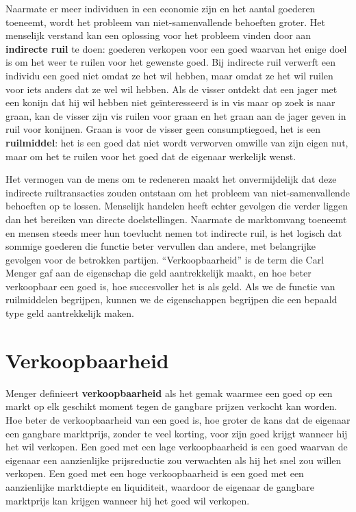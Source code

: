 Naarmate er meer individuen in een economie zijn en het aantal goederen toeneemt, wordt het probleem van niet-samenvallende behoeften groter. Het menselijk verstand kan een oplossing voor het probleem vinden door aan \textbf{indirecte ruil} te doen: goederen verkopen voor een goed waarvan het enige doel is om het weer te ruilen voor het gewenste goed. Bij indirecte ruil verwerft een individu een goed niet omdat ze het wil hebben, maar omdat ze het wil ruilen voor iets anders dat ze wel wil hebben. Als de visser ontdekt dat een jager met een konijn dat hij wil hebben niet geïnteresseerd is in vis maar op zoek is naar graan, kan de visser zijn vis ruilen voor graan en het graan aan de jager geven in ruil voor konijnen. Graan is voor de visser geen consumptiegoed, het is een \textbf{ruilmiddel}: het is een goed dat niet wordt verworven omwille van zijn eigen nut, maar om het te ruilen voor het goed dat de eigenaar werkelijk wenst.

Het vermogen van de mens om te redeneren maakt het onvermijdelijk dat deze indirecte ruiltransacties zouden ontstaan om het probleem van niet-samenvallende behoeften op te lossen. Menselijk handelen heeft echter gevolgen die verder liggen dan het bereiken van directe doelstellingen. Naarmate de marktomvang toeneemt en mensen steeds meer hun toevlucht nemen tot indirecte ruil, is het logisch dat sommige goederen die functie beter vervullen dan andere, met belangrijke gevolgen voor de betrokken partijen. ``Verkoopbaarheid'' is de term die Carl Menger gaf aan de eigenschap die geld aantrekkelijk maakt, en hoe beter verkoopbaar een goed is, hoe succesvoller het is als geld. Als we de functie van ruilmiddelen begrijpen, kunnen we de eigenschappen begrijpen die een bepaald type geld aantrekkelijk maken.

\hypertarget{verkoopbaarheid}{%
\section{Verkoopbaarheid}\label{verkoopbaarheid}}

Menger definieert \textbf{verkoopbaarheid} als het gemak waarmee een goed op een markt op elk geschikt moment tegen de gangbare prijzen verkocht kan worden. Hoe beter de verkoopbaarheid van een goed is, hoe groter de kans dat de eigenaar een gangbare marktprijs, zonder te veel korting, voor zijn goed krijgt wanneer hij het wil verkopen. Een goed met een lage verkoopbaarheid is een goed waarvan de eigenaar een aanzienlijke prijsreductie zou verwachten als hij het snel zou willen verkopen. Een goed met een hoge verkoopbaarheid is een goed met een aanzienlijke marktdiepte en liquiditeit, waardoor de eigenaar de gangbare marktprijs kan krijgen wanneer hij het goed wil verkopen.

